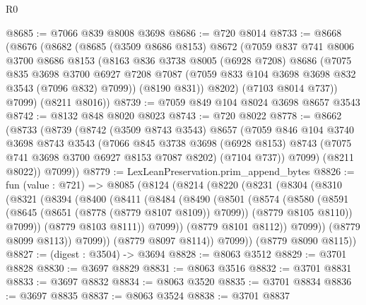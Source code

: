 \begin{lexlean}{R0}
\begin{coremodule}
@8685 := @7066 @839 @8008 @3698
@8686 := @720 @8014
@8733 := @8668
    (@8676
      (@8682
        (@8685
          (@3509 @8686 @8153)
          @8672
          (@7059
            @837
            @741
            @8006
            @3700
            @8686
            @8153
            (@8163
              @836
              @3738
              @8005
              (@6928 @7208)
              @8686
              (@7075
                @835
                @3698
                @3700
                @6927
                @7208
                @7087
                (@7059 @833 @104 @3698 @3698 @832 @3543 (@7096 @832) @7099))
              (@8190 @831))
            @8202)
          (@7103 @8014 @737))
        @7099)
      (@8211 @8016))
@8739 := @7059 @849 @104 @8024 @3698 @8657 @3543
@8742 := @8132 @848 @8020 @8023
@8743 := @720 @8022
@8778 := @8662
    (@8733
      (@8739
        (@8742
          (@3509 @8743 @3543)
          @8657
          (@7059
            @846
            @104
            @3740
            @3698
            @8743
            @3543
            (@7066
              @845
              @3738
              @3698
              (@6928 @8153)
              @8743
              (@7075 @741 @3698 @3700 @6927 @8153 @7087 @8202)
              (@7104 @737))
            @7099)
          (@8211 @8022))
        @7099))
@8779 := LexLeanPreservation.prim_append_bytes
@8826 := fun (value : @721) =>
  @8085
    (@8124
      (@8214
        (@8220
          (@8231
            (@8304
              (@8310
                (@8321
                  (@8394
                    (@8400
                      (@8411
                        (@8484
                          (@8490
                            (@8501
                              (@8574
                                (@8580
                                  (@8591
                                    (@8645 (@8651 (@8778 (@8779 @8107 @8109)) @7099))
                                    (@8779 @8105 @8110))
                                  @7099))
                              (@8779 @8103 @8111))
                            @7099))
                        (@8779 @8101 @8112))
                      @7099))
                  (@8779 @8099 @8113))
                @7099))
            (@8779 @8097 @8114))
          @7099))
      (@8779 @8090 @8115))
@8827 := (digest : @3504) -> @3694
@8828 := @8063 @3512
@8829 := @3701 @8828
@8830 := @3697 @8829
@8831 := @8063 @3516
@8832 := @3701 @8831
@8833 := @3697 @8832
@8834 := @8063 @3520
@8835 := @3701 @8834
@8836 := @3697 @8835
@8837 := @8063 @3524
@8838 := @3701 @8837

\end{coremodule}
\end{lexlean}
